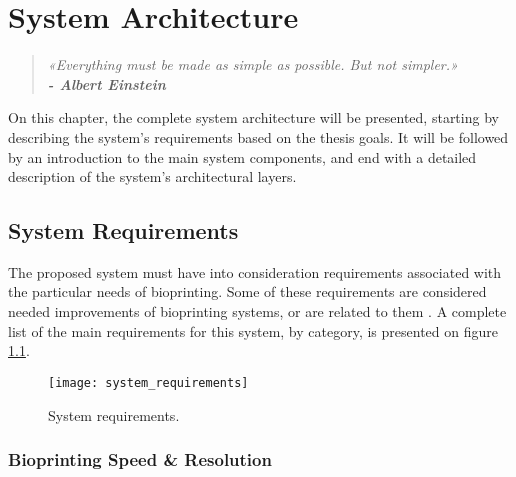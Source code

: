\chapter{System Architecture}
\label{cha:system_architecture}

\begin{quotation}
\begin{flushright}
\itshape
«Everything must be made as simple as possible. But not simpler.»\\
\textbf{- Albert Einstein}
\end{flushright}
\end{quotation}

On this chapter, the complete system architecture will be presented, starting by describing the system's requirements based on the thesis goals. It will be followed by an introduction to the main system components, and end with a detailed description of the system's architectural layers.


\section{System Requirements}
\label{sec:system_architecture_requirements}

The proposed system must have into consideration requirements associated with the particular needs of bioprinting. Some of these requirements are considered needed improvements of bioprinting systems, or are related to them \cite{Ozbolat2017_evaluation_bioprinter_tech}. A complete list of the main requirements for this system, by category, is presented on figure \ref{fig:system_requirements}.

\begin{figure}[htbp]
	\centering
	\texttt{[image: system\_requirements]}
	\caption[System requirements.]{System requirements.}
	\label{fig:system_requirements}
\end{figure}

\subsection{Bioprinting Speed \& Resolution}
\label{subsec:system_architecture_requirements_bioprinting_speed_resolution}

